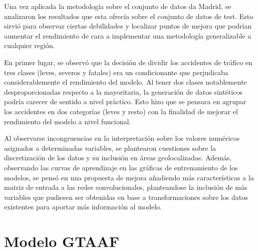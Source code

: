 \documentclass{uathesis-es}
\begin{document}

Una vez aplicada la metodología sobre el conjunto de datos da Madrid, se analizaron los resultados que esta ofrecía sobre el conjunto de datos de test. Esto sirvió para observar ciertas debilidades y localizar puntos de mejora que podrían aumentar el rendimiento de cara a implementar una metodología generalizable a cualquier región.

En primer lugar, se observó que la decisión de dividir los accidentes de tráfico en tres clases (leves, severos y fatales) era un condicionante que perjudicaba considerablemente el rendimiento del modelo. Al tener dos clases notablemente desproporcionadas respecto a la mayoritaria, la generación de datos sintéticos podría carecer de sentido a nivel práctico. Esto hizo que se pensara en agrupar los accidentes en dos categorías (leves y resto) con la finalidad de mejorar el rendimiento del modelo a nivel funcional.


Al observarse incongruencias en la interpretación sobre los valores numéricos asignados a determinadas variables, se plantearon cuestiones sobre la discretización de los datos y su inclusión en áreas geolocalizadas. Además, observando las curvas de aprendizaje en las gráficas de entrenamiento de los modelos, se pensó en una propuesta de mejora añadiendo más características a la matriz de entrada a las redes convolucionales, planteandose la inclusión de más variables que pudiesen ser obtenidas en base a transformaciones sobre los datos existentes para aportar más información al modelo.

\section{Modelo GTAAF}
\label{METODOLOGIA_GTAAF}

\end{document}
